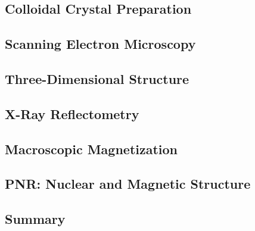 \documentclass[\main/dresen_thesis.tex]{subfiles}
\renewcommand{\thisPath}{\main/chapters/colloidalCrystals/colloidalCrystals}
\begin{document}
  \subsection{Colloidal Crystal Preparation}
  
    \FloatBarrier

  \subsection{Scanning Electron Microscopy}
  
    \FloatBarrier

  \subsection{Three-Dimensional Structure}
  
    \FloatBarrier

  \subsection{X-Ray Reflectometry}
  
    \FloatBarrier

  \subsection{Macroscopic Magnetization}
  
    \FloatBarrier

  \subsection{PNR: Nuclear and Magnetic Structure}
  
    \FloatBarrier

  \clearpage
  \subsection{Summary}
  
    \FloatBarrier
\end{document}
